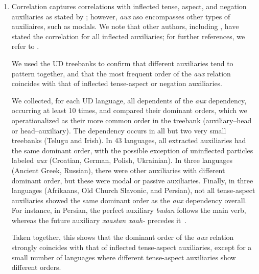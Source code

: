 \documentclass[10pt,twoside,lineno]{article}
\begin{document}
\begin{enumerate}
	\item Correlation  captures correlations with inflected tense, aspect, and negation auxiliaries as stated by \citet{dryer1992greenbergian}; however, \emph{aux} aso encompasses other types of auxiliaires, such as modals.
We note that other authors, including \citet{greenberg1963universals}, have stated the correlation for all inflected auxiliaries; for further references, we refer to \citet[Number 501]{plank2000universals}.

We used the UD treebanks to confirm that different auxiliaries tend to pattern together, and that the most frequent order of the \emph{aux} relation coincides with that of inflected tense-aspect or negation auxiliaries.

We collected, for each UD language, all dependents of the \emph{aux} dependency, occurring at least 10 times, and compared their dominant orders, which we operationalized as their more common order in the treebank (auxiliary--head or head--auxiliary).
The dependency occurs in all but two very small treebanks (Telugu and Irish).
In 43 languages, all extracted auxiliaries had the same dominant order, with the possible exception of uninflected particles labeled \emph{aux} (Croatian, German, Polish, Ukrainian).
In three languages (Ancient Greek, Russian), there were other auxiliaries with different dominant order, but these were modal or passive auxiliaries.
Finally, in three languages (Afrikaans, Old Church Slavonic, and Persian), not all tense-aspect auxiliaries showed the same dominant order as the \emph{aux} dependency overall.
For instance, in Persian, the perfect auxiliary \emph{budan} follows the main verb, whereas the future auxiliary \emph{xaastan xaah-} precedes it~\citep[pp. 117, 121]{mace2015persian}.


Taken together, this shows that the dominant order of the \emph{aux} relation strongly coincides with that of inflected tense-aspect auxiliaries, except for a small number of languages where different tense-aspect auxiliaries show different orders.




\end{enumerate}
\end{document}
